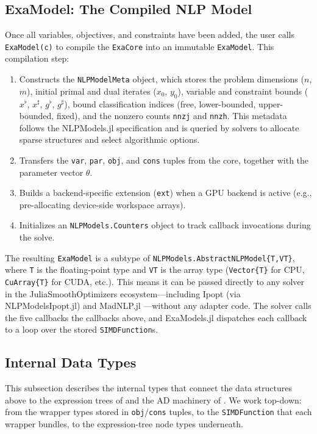 \documentclass[11pt]{article}
\begin{document}
\subsection{ExaModel: The Compiled NLP Model}
\label{sec:data:model}

Once all variables, objectives, and constraints have been added, the user calls \texttt{ExaModel(c)} to compile the \texttt{ExaCore} into an immutable \texttt{ExaModel}. This compilation step:
\begin{enumerate}
  \item Constructs the \texttt{NLPModelMeta} object, which stores the problem dimensions ($n$, $m$), initial primal and dual iterates ($x_0$, $y_0$), variable and constraint bounds ($x^\flat$, $x^\sharp$, $g^\flat$, $g^\sharp$), bound classification indices (free, lower-bounded, upper-bounded, fixed), and the nonzero counts \texttt{nnzj} and \texttt{nnzh}. This metadata follows the NLPModels.jl specification and is queried by solvers to allocate sparse structures and select algorithmic options.
  \item Transfers the \texttt{var}, \texttt{par}, \texttt{obj}, and \texttt{cons} tuples from the core, together with the parameter vector $\theta$.
  \item Builds a backend-specific extension (\texttt{ext}) when a GPU backend is active (e.g., pre-allocating device-side workspace arrays).
  \item Initializes an \texttt{NLPModels.Counters} object to track callback invocations during the solve.
\end{enumerate}
The resulting \texttt{ExaModel} is a subtype of \texttt{NLPModels.AbstractNLPModel\{T,VT\}}, where \texttt{T} is the floating-point type and \texttt{VT} is the array type (\texttt{Vector\{T\}} for CPU, \texttt{CuArray\{T\}} for CUDA, etc.). This means it can be passed directly to any solver in the JuliaSmoothOptimizers ecosystem---including Ipopt (via NLPModelsIpopt.jl) and MadNLP.jl \citep{shinMadNLPjl2025}---without any adapter code. The solver calls the five callbacks the callbacks above, and ExaModels.jl dispatches each callback to a loop over the stored \texttt{SIMDFunction}s.

\subsection{Internal Data Types}
\label{sec:data:internal}

This subsection describes the internal types that connect the data structures above to the expression trees of  and the AD machinery of . We work top-down: from the wrapper types stored in \texttt{obj}/\texttt{cons} tuples, to the \texttt{SIMDFunction} that each wrapper bundles, to the expression-tree node types underneath.
\end{document}
